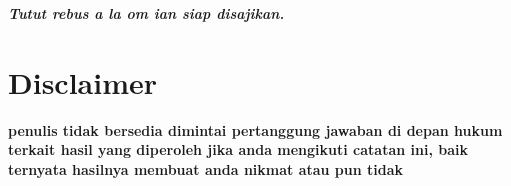\documentclass[a4paper]{article}
\begin{document}
\begin{center}\emph{\textbf{Tutut rebus a la om ian siap disajikan.}}\end{center}
\section{Disclaimer}
\textbf{penulis tidak bersedia dimintai pertanggung jawaban di depan hukum terkait hasil yang diperoleh jika anda mengikuti catatan ini, baik ternyata hasilnya membuat anda nikmat atau pun tidak}
\end{document}
